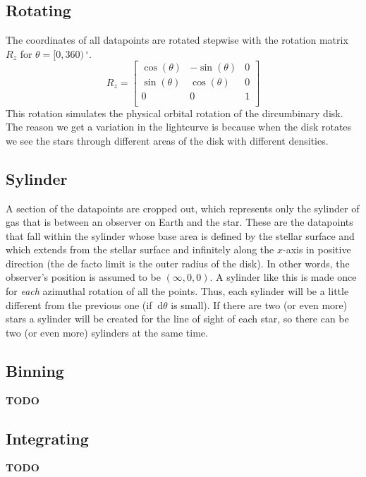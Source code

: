 \documentclass[a4paper, 12pt, english, titlepage]{article}
\newcommand{\D}[1]{\ \mathrm{d}#1} %
\newcommand{\degree}{\, ^\circ}    %
\begin{document}
\subsection{Rotating}
    The coordinates of all datapoints are rotated stepwise with the rotation
    matrix $R_z$ for $\theta = [0, 360)\degree$.
    $$
    R_z =
    \begin{bmatrix}
        \cos(\theta) & -\sin(\theta) &              0 \\
        \sin(\theta) &  \cos(\theta) &              0 \\
                   0 &             0 &              1 \\
    \end{bmatrix}
    $$
    This rotation simulates the physical orbital rotation of the dircumbinary
    disk. The reason we get a variation in the lightcurve is because when the
    disk rotates we see the stars through different areas of the disk with
    different densities.

\subsection{Sylinder}
    A section of the datapoints are cropped out, which represents only the sylinder of gas that is between an observer on Earth and the star. These are the datapoints that fall within the sylinder whose base area is defined by the stellar surface and which extends from the stellar surface and infinitely along the $x$-axis in positive direction (the de facto limit is the outer radius of the disk). In other words, the observer's position is assumed to be $(\infty, 0, 0)$. A sylinder like this is made once for \emph{each} azimuthal rotation of all the points. Thus, each sylinder will be a little different from the previous one (if $\D\theta$ is small). If there are two (or even more) stars a sylinder will be created for the line of sight of each star, so there can be two (or even more) sylinders at the same time.

\subsection{Binning}
    \textbf{TODO}

\subsection{Integrating}
    \textbf{TODO}


\end{document}
